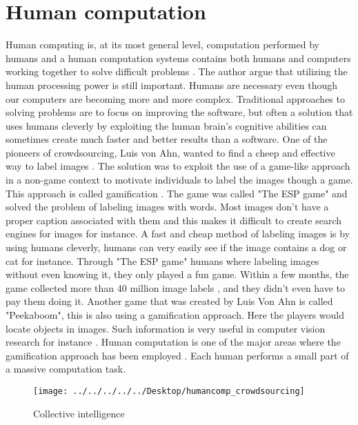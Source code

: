 \section{Human computation}\label{sec:humancomputation}
Human computing is, at its most general level, computation performed by humans and a human computation systems contains both humans and computers working together to solve difficult problems \citep{Schulze2012}. The author argue that utilizing the human processing power is still important. Humans are necessary even though our computers are becoming more and more complex. Traditional approaches to solving problems are to focus on improving the software, but often a solution that uses humans cleverly by exploiting the human brain's cognitive abilities can sometimes create much faster and better results than a software. One of the pioneers of crowdsourcing, Luis von Ahn, wanted to find a cheep and effective way to label images \citep{VonAhn2008}. The solution was to exploit the use of a game-like approach in a non-game context to motivate individuals to label the images though a game. This approach is called gamification \citep{Huotari2017}. The game was called "The ESP game" and solved the problem of labeling images with words. Most images don't have a proper caption associated with them and this makes it difficult to create search engines for images for instance. A fast and cheap method of labeling images is by using humans cleverly, humans can very easily see if the image contains a dog or cat for instance. Through "The ESP game" humans where labeling images without even knowing it, they only played a fun game. Within a few months, the game collected more than 40 million image labels \citep{VonAhn2008}, and they didn't even have to pay them doing it. Another game that was created by Luis Von Ahn is called "Peekaboom", this is also using a gamification approach. Here the players would locate objects in images. Such information is very useful in computer vision research for instance \citep{VonAhn2008}. Human computation is one of the major areas where the gamification approach has been employed \citep{Morschheuser2016}. Each human performs a small part of a massive computation task.  

\begin{figure}[H]
	\centering
	\texttt{[image: ../../../../../Desktop/humancomp\_crowdsourcing]}
	\caption{Collective intelligence \citep{Quinn2011}}
	\label{fig:humancompcrowdsourcing}
\end{figure}

